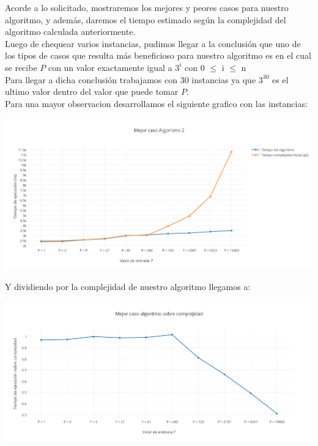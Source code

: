 \indent Acorde a lo solicitado, mostraremos los mejores y peores casos para nuestro algoritmo, y adem\'as, daremos el tiempo estimado 
seg\'un la complejidad del algoritmo calculada anteriormente.\\

Luego de chequear varios instancias, pudimos llegar a la conclusi\'on que uno de los tipos de casos que resulta m\'as beneficioso para nuestro algoritmo
es en el cual se recibe $P$ con un valor exactamente igual a $3^i$ con 0 $\leq$ i $\leq$ n \\

Para llegar a dicha conclusi\'on trabajamos con 30 instancias ya que $3^{30}$ es el ultimo valor dentro del valor que puede tomar $P$.\\

Para una mayor observacion desarrollamos el siguiente grafico con las instancias:\\

\vspace*{0.3cm} \vspace*{0.3cm}
  \begin{center}
 \includegraphics[scale=0.6]{./EJ2/mejorcaso.png}
  \end{center}
  \vspace*{0.3cm}
  
Y dividiendo por la complejidad de nuestro algoritmo llegamos a:\\

\vspace*{0.3cm} \vspace*{0.3cm}
  \begin{center}
\includegraphics[scale=0.6]{./EJ2/mejorcaso2.png}
  \end{center}
  \vspace*{0.3cm}

